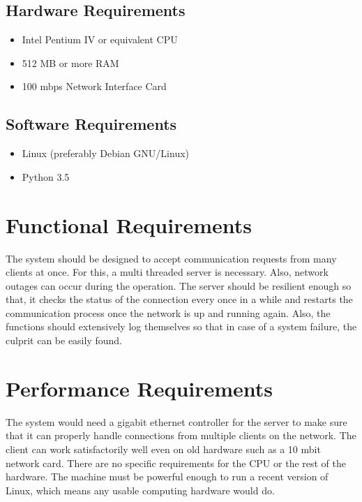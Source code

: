 \subsection{Hardware Requirements}
\begin{itemize}
    \item Intel Pentium IV or equivalent CPU
    \item 512 MB or more RAM
    \item 100 mbps Network Interface Card
\end{itemize}

\subsection{Software Requirements}
\begin{itemize}
    \item Linux (preferably Debian GNU/Linux)
    \item Python 3.5
\end{itemize}

\section{Functional Requirements}
The system should be designed to accept communication requests from many
clients at once. For this, a multi threaded server is necessary. Also, network
outages can occur during the operation. The server should be resilient enough
so that, it checks the status of the connection every once in a while and
restarts the communication process once the network is up and running again.
Also, the functions should extensively log themselves so that in case of a
system failure, the culprit can be easily found.

\section{Performance Requirements}
The system would need a gigabit ethernet controller for the server to make sure
that it can properly handle connections from multiple clients on the network.
The client can work satisfactorily well even on old hardware such as a 10 mbit
network card. There are no specific requirements for the CPU or the rest of the
hardware. The machine must be powerful enough to run a recent version of Linux,
which means any usable computing hardware would do.

